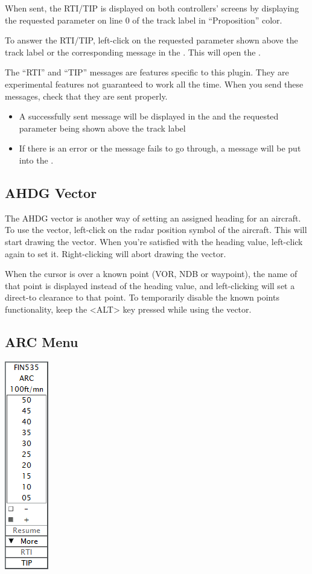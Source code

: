 \documentclass[11pt,a4paper,oldfontcommands]{memoir}
\newenvironment{Warn}
  {\begin{shaded}\marginnote{\fbox{Warning}}}
  {\end{shaded}}
\begin{document}
When sent, the RTI/TIP is displayed on both controllers’ screens by displaying the requested parameter on line 0 of the track label in “Proposition” color.

To answer the RTI/TIP, left-click on the requested parameter shown above the track label or the corresponding message in the \textit{}. This will open the \textit{}.

\begin{Warn}
The “RTI” and “TIP” messages are features specific to this plugin. They are experimental features not guaranteed to work all the time. When you send these messages, check that they are sent properly.

\begin{itemize}
        \item A successfully sent message will be displayed in the \textit{} and the requested parameter being shown above the track label
        \item If there is an error or the message fails to go through, a message will be put into the \textit{}.
\end{itemize}
\end{Warn}

\subsection{AHDG Vector}
\label{menu:ahdgv}
The AHDG vector is another way of setting an assigned heading for an aircraft. To use the vector, left-click on the radar position symbol of the aircraft. This will start drawing the vector. When you’re satisfied with the heading value, left-click again to set it. Right-clicking will abort drawing the vector.

When the cursor is over a known point (VOR, NDB or waypoint), the name of that point is displayed instead of the heading value, and left-clicking will set a direct-to clearance to that point. To temporarily disable the known points functionality, keep the <ALT> key pressed while using the vector.

\subsection{ARC Menu}
\label{menu:arc}
\includegraphics{img/arc.png}
\end{document}
